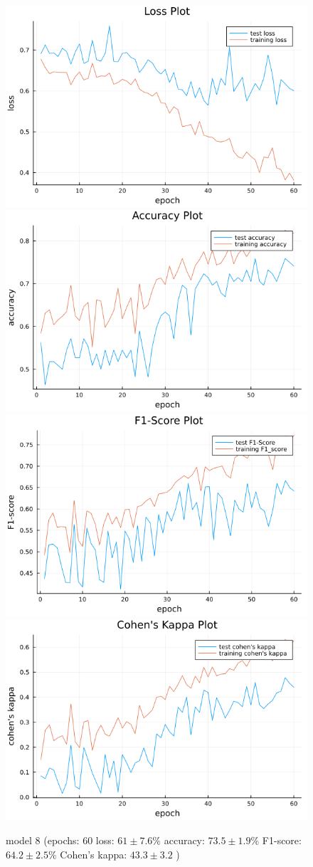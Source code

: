 \documentclass[
a4paper, 
12pt,
grayscalebody, %
abstract=on,
twoside, BCOR10mm, 12pt, DIV13,headinclude, footexclude, final, abstracton, openright
]{ibireprt}
\numberwithin{equation}{chapter}
\numberwithin{table}{chapter}
\numberwithin{figure}{chapter}
\numberwithin{algorithm}{chapter}
\numberwithin{example}{chapter}
\numberwithin{example}{chapter}
\begin{document}
\begin{figure}[h]
	\includegraphics[width=0.4\linewidth]{loss_png_final_2_4.png}\hfill
	\includegraphics[width=0.4\linewidth]{accuracy_png_final_2_4.png}
	\\[\smallskipamount]
	\includegraphics[width=0.4\linewidth]{f1_score_png_final_2_4.png}\hfill
	\includegraphics[width=0.4\linewidth]{cohens_kappa_png_final_2_4.png}
	\caption{model 8 (epochs: 60 loss: $61\pm7.6\% $ accuracy: $73.5\pm1.9\%$ F1-score: $64.2\pm2.5\%$  Cohen's kappa: $43.3\pm3.2$ )}
\end{figure}
\end{document}
